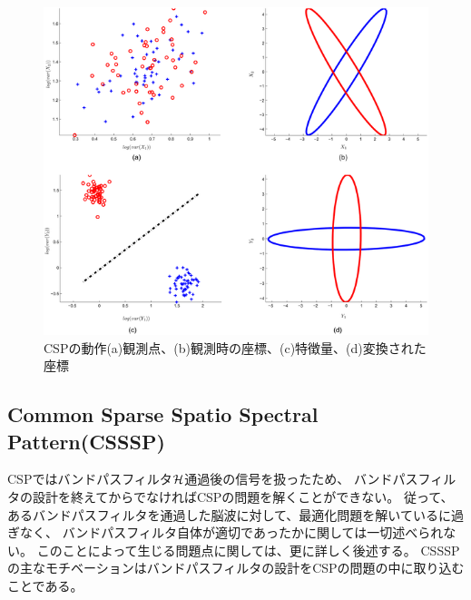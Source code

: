 \begin{figure}
    \centering
    \includegraphics[width=13cm]{images/apple.png}
    \caption{CSPの動作(a)観測点、(b)観測時の座標、(c)特徴量、(d)変換された座標}
    \label{fig:apple}
\end{figure}
  

\subsection{\rm Common Sparse Spatio Spectral Pattern(CSSSP)}
CSPではバンドパスフィルタ\(\cal H\)通過後の信号を扱ったため、
バンドパスフィルタの設計を終えてからでなければCSPの問題を解くことができない。
従って、あるバンドパスフィルタを通過した脳波に対して、最適化問題を解いているに過ぎなく、
バンドパスフィルタ自体が適切であったかに関しては一切述べられない。
このことによって生じる問題点に関しては、更に詳しく後述する。
CSSSPの主なモチベーションはバンドパスフィルタの設計をCSPの問題の中に取り込むことである\cite{csssp}。

